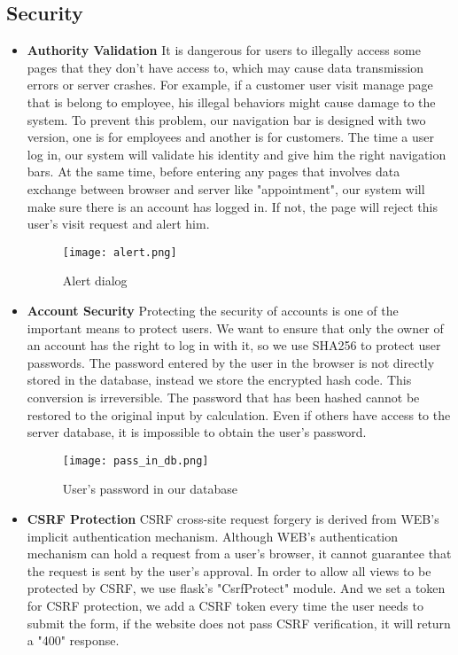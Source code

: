 \documentclass[a4paper]{article}
\begin{document}
\subsection{Security}
\begin{itemize}
    \item \textbf{Authority Validation}
    \newline
    It is dangerous for users to illegally access some pages that they don't have access to, which may cause data transmission errors or server crashes. For example, if a customer user visit manage page that is belong to employee, his illegal behaviors might cause damage to the system. To prevent this problem, our navigation bar is designed with two version, one is for employees and another is for customers. The time a user log in, our system will validate his identity and give him the right navigation bars. At the same time, before entering any pages that involves data exchange between browser and server like "appointment", our system will make sure there is an account has logged in. If not, the page will reject this user's visit request and alert him.
    \begin{figure}[h]
         \centering
         \texttt{[image: alert.png]}
         \caption{Alert dialog}
         \label{alert_dialog}
     \end{figure}
    
    \item \textbf{Account Security}
    \newline
    Protecting the security of accounts is one of the important means to protect users. We want to ensure that only the owner of an account has the right to log in with it, so we use SHA256 to protect user passwords. The password entered by the user in the browser is not directly stored in the database, instead we store the encrypted hash code. This conversion is irreversible. The password that has been hashed cannot be restored to the original input by calculation. Even if others have access to the server database, it is impossible to obtain the user's password.
    \begin{figure}[h]
         \centering
         \texttt{[image: pass\_in\_db.png]}
         \caption{User's password in our database}
         \label{pass_in_db}
     \end{figure}
    \item \textbf{CSRF Protection}
    \newline
    CSRF cross-site request forgery is derived from WEB's implicit authentication mechanism. Although WEB's authentication mechanism can hold a request from a user's browser, it cannot guarantee that the request is sent by the user's approval. In order to allow all views to be protected by CSRF, we use flask's "CsrfProtect" module. And we set a token for CSRF protection, we add a CSRF token every time the user needs to submit the form, if the website does not pass CSRF verification, it will return a "400" response.
\end{itemize}
\end{document}

